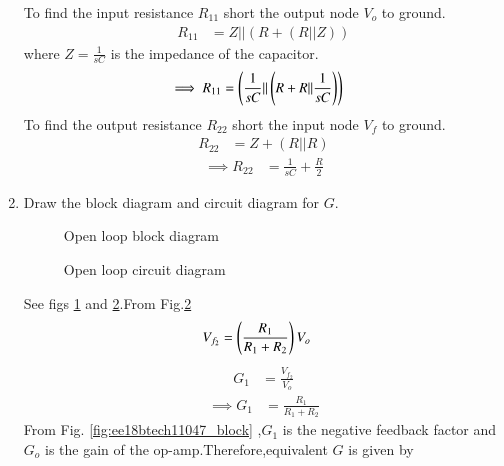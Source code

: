 \begin{enumerate}[label=\arabic*.,ref=\theenumi]
\solution To find the input resistance $R_{11}$ short the output node $V_{o}$ to ground.
\begin{align}
R_{11} &= Z ||(R+ (R||Z)) 
\end{align}
where $Z=\frac{1}{sC}$ is the impedance of the capacitor.
\begin{align}
\label{eq:ee18btech11047_6}
\implies R_{11} &= \brak{\frac{1}{sC}||\brak{R+R ||\frac{1}{sC}}}
\end{align}
To find the output resistance $R_{22}$ short the input node $V_{f}$ to ground.
\begin{align}
R_{22} &= Z + (R||R)
\end{align}
\begin{align}
\implies R_{22} &= \frac{1}{sC} + \frac{R}{2}   
\end{align}
%
\item Draw the block diagram and circuit diagram for $G$.\\
\renewcommand{\thefigure}{\theenumi.\arabic{figure}}
%
\begin{figure}[!ht]
	\begin{center}
		\resizebox{\columnwidth}{!}{}
	\end{center}
\caption{Open loop block diagram}
\label{fig:ee18btech11047_fig6}
\end{figure}
%
\begin{figure}[!ht]
	\begin{center}
		\resizebox{\columnwidth}{!}{}
	\end{center}
\caption{Open loop circuit diagram}
\label{fig:ee18btech11047_fig7}
\end{figure}
\renewcommand{\thefigure}{\theenumi}
\solution See figs \ref{fig:ee18btech11047_fig6} and \ref{fig:ee18btech11047_fig7}.From Fig.\ref{fig:ee18btech11047_fig7}
\begin{align}
V_{f_{2}} &= \left(\frac{R_{1}}{R_{1} + R_{2}}\right)V_{o}
\end{align}
\begin{align}
G_{1} &= \frac{V_{f_{2}}}{V_{o}}
\end{align}
\begin{align}
\label{eq:ee18btech11047_G1}
\implies G_{1} &= \frac{R_{1}}{R_{1} + R_{2}}
\end{align}
From Fig. \ref{fig:ee18btech11047_block} ,$G_{1}$ is the negative feedback factor and $G_{o}$ is the gain of the op-amp.Therefore,equivalent $G$ is given by
\begin{align}

\end{align}
\end{enumerate}
